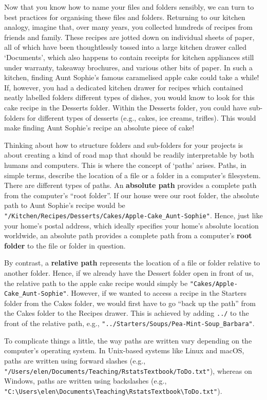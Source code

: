 \documentclass[
  letterpaper,
  DIV=11,
  numbers=noendperiod]{scrreprt}
\begin{document}
Now that you know how to name your files and folders sensibly, we can
turn to best practices for organising these files and folders. Returning
to our kitchen analogy, imagine that, over many years, you collected
hundreds of recipes from friends and family. These recipes are jotted
down on individual sheets of paper, all of which have been thoughtlessly
tossed into a large kitchen drawer called `Documents', which also
happens to contain receipts for kitchen appliances still under warranty,
takeaway brochures, and various other bits of paper. In such a kitchen,
finding Aunt Sophie's famous caramelised apple cake could take a while!
If, however, you had a dedicated kitchen drawer for recipes which
contained neatly labelled folders different types of dishes, you would
know to look for this cake recipe in the Desserts folder. Within the
Desserts folder, you could have sub-folders for different types of
desserts (e.g., cakes, ice creams, trifles). This would make finding
Aunt Sophie's recipe an absolute piece of cake!

Thinking about how to structure folders and sub-folders for your
projects is about creating a kind of road map that should be readily
interpretable by both humans and computers. This is where the concept of
`paths' arises. Paths, in simple terms, describe the location of a file
or a folder in a computer's filesystem. There are different types of
paths. An \textbf{absolute path} provides a complete path from the
computer's ``root folder''. If our house were our root folder, the
absolute path to Aunt Sophie's recipe would be
\texttt{"/Kitchen/Recipes/Desserts/Cakes/Apple-Cake\_Aunt-Sophie"}.
Hence, just like your home's postal address, which ideally specifies
your home's absolute location worldwide, an absolute path provides a
complete path from a computer's \textbf{root folder} to the file or
folder in question.

By contrast, a \textbf{relative path} represents the location of a file
or folder relative to another folder. Hence, if we already have the
Dessert folder open in front of us, the relative path to the apple cake
recipe would simply be \texttt{"Cakes/Apple-Cake\_Aunt-Sophie"}.
However, if we wanted to access a recipe in the Starters folder from the
Cakes folder, we would first have to go ``back up the path'' from the
Cakes folder to the Recipes drawer. This is achieved by adding
\texttt{../} to the front of the relative path, e.g.,
\texttt{"../Starters/Soups/Pea-Mint-Soup\_Barbara"}.

To complicate things a little, the way paths are written vary depending
on the computer's operating system. In Unix-based systems like Linux and
macOS, paths are written using forward slashes (e.g.,
\texttt{"/Users/elen/Documents/Teaching/RstatsTextbook/ToDo.txt"}),
whereas on Windows, paths are written using backslashes (e.g.,
\texttt{"C:\textbackslash{}Users\textbackslash{}elen\textbackslash{}Documents\textbackslash{}Teaching\textbackslash{}RstatsTextbook\textbackslash{}ToDo.txt"}).
\end{document}
